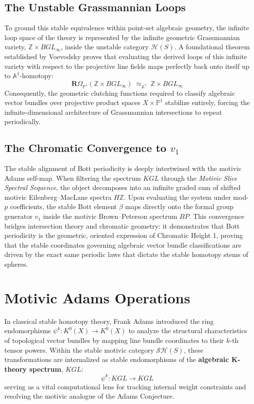 \documentclass[11pt,oneside]{article}
\begin{document}
\subsection{The Unstable Grassmannian Loops}
To ground this stable equivalence within point-set algebraic geometry, the infinite loop space of the theory is represented by the infinite geometric Grassmannian variety, $\mathbb{Z} \times BGL_\infty$, inside the unstable category $\mathcal{H}(S)$. A foundational theorem established by Voevodsky proves that evaluating the derived loops of this infinite variety with respect to the projective line fields maps perfectly back onto itself up to $\mathbb{A}^1$-homotopy:
\[ \mathbf{R}\Omega_{\mathbb{P}^1}\left( \mathbb{Z} \times BGL_\infty \right) \;\simeq_{\mathbb{A}^1}\; \mathbb{Z} \times BGL_\infty \]
Consequently, the geometric clutching functions required to classify algebraic vector bundles over projective product spaces $X \times \mathbb{P}^1$ stabilize entirely, forcing the infinite-dimensional architecture of Grassmannian intersections to repeat periodically.

\subsection{The Chromatic Convergence to $v_1$}
The stable alignment of Bott periodicity is deeply intertwined with the motivic Adams self-map. When filtering the spectrum $KGL$ through the \emph{Motivic Slice Spectral Sequence}, the object decomposes into an infinite graded sum of shifted motivic Eilenberg--MacLane spectra $H\mathbb{Z}$. Upon evaluating the system under mod-$p$ coefficients, the stable Bott element $\beta$ maps directly onto the formal group generator $v_1$ inside the motivic Brown--Peterson spectrum $BP$. This convergence bridges intersection theory and chromatic geometry: it demonstrates that Bott periodicity is the geometric, oriented expression of Chromatic Height 1, proving that the stable coordinates governing algebraic vector bundle classifications are driven by the exact same periodic laws that dictate the stable homotopy stems of spheres.

\section{Motivic Adams Operations}
In classical stable homotopy theory, Frank Adams introduced the ring endomorphisms $\psi^k: K^0(X) \to K^0(X)$ to analyze the structural characteristics of topological vector bundles by mapping line bundle coordinates to their $k$-th tensor powers. Within the stable motivic category $\mathcal{S}\mathcal{H}(S)$, these transformations are internalized as stable endomorphisms of the \textbf{algebraic K-theory spectrum}, $KGL$:
\[ \psi^k: KGL \longrightarrow KGL \]
serving as a vital computational lens for tracking internal weight constraints and resolving the motivic analogue of the Adams Conjecture.
\end{document}
